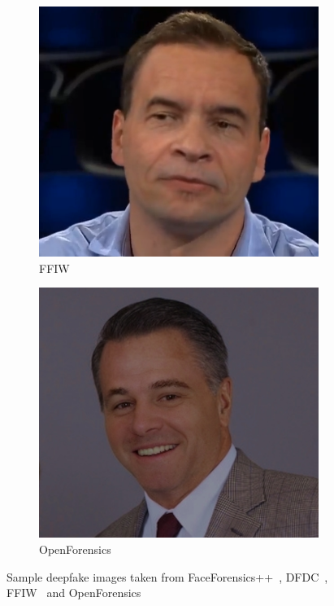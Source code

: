 \begin{figure}[htbp]
\begin{subfigure}{.45\textwidth}
		\includegraphics[width=.8\linewidth]{figures/method3}
		\caption{FFIW}\label{fig:sub3}
	\end{subfigure}%
	\hspace{-5mm}
	\begin{subfigure}{.45\textwidth}
		\centering
		\includegraphics[width=.8\linewidth]{figures/method4}
		\caption{OpenForensics}\label{fig:sub4}
	\end{subfigure}
	\caption{Sample deepfake images taken from FaceForensics++~\cite{roessler2019faceforensicspp},
		DFDC~\cite{dolhansky2020deepfake}, FFIW~\cite{Zhou_2021_CVPR}
		and OpenForensics~\cite{ltnghia-ICCV2021}}\label{fig:sample-deepfakes}
\end{figure}

